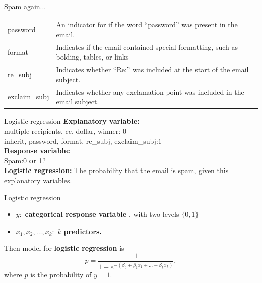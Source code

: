 \documentclass[12pt,a4paper]{beamer}
\begin{document}
\begin{frame}{Spam again...}
\begin{table}
{\begin{tabular}{lp{10.5cm}}
					password & An indicator for if the word ``password'' was present in the email.  \\
					format & Indicates if the email contained special formatting, such as bolding, tables, or links    \\
					re\_subj & Indicates whether ``Re:'' was included at the start of the email subject.   \\
					exclaim\_subj & Indicates whether any exclamation point was included in the email subject.    \\
					\hline
					\end{tabular}}
					\end{table}
				\end{frame}
				\begin{frame}{Logistic regression}
				\textbf{Explanatory variable:}\\
				  multiple recipients, cc, dollar, winner: $0$\\
				inherit, password, format, re\_subj, exclaim\_subj:$1$\\
				\textbf{Response variable:}\\
				Spam:0 \textbf{or} 1?\\
				\textbf{Logistic regression:} The probability that the email is spam, given this explanatory variables.
					\end{frame}
					\begin{frame}{Logistic regression}
					\begin{itemize}
						\item $y:$ \textbf{categorical response variable }, with two levels $\{0,1\}$
						\item  $x_1,x_2,\dots,x_k:$ $k$  \textbf{predictors.} 
					\end{itemize}
						Then model for \textbf{logistic regression} is
						\[p=\frac{1}{1+e^{-(\beta_0+\beta_1x_1+\dots+\beta_kx_k)}},\] 
 where $p$ is the probability of $y=1$.
					\end{frame}
\end{document}
